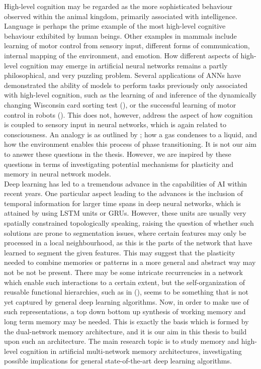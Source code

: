 High-level cognition may be regarded as the more sophisticated behaviour observed within the animal kingdom, primarily associated with intelligence. Language is perhaps the prime example of the most high-level cognitive behaviour exhibited by human beings. Other examples in mammals include learning of motor control from sensory input, different forms of communication, internal mapping of the environment, and emotion.
How different aspects of high-level cognition may emerge in artificial neural networks remains a partly philosophical, and very puzzling problem. Several applications of ANNs have demonstrated the ability of models to perform tasks previously only associated with high-level cognition, such as the learning of and inference of the dynamically changing Wisconsin card sorting test (\cite{Maniadakis2012}), or the successful learning of motor control in robots (\cite{Sugita2005, Yamashita2008, Tani2014}). 
This does not, however, address the aspect of how cognition is coupled to sensory input in neural networks, which is again related to consciousness. An analogy is as outlined by \cite{Freeman2003}; how a gas condenses to a liquid, and how the environment enables this process of phase transitioning.
It is not our aim to answer these questions in the thesis. However, we are inspired by these questions in terms of investigating potential mechanisms for plasticity and memory in neural network models.
\\

Deep learning has led to a tremendous advance in the capabilities of AI within recent years. One particular aspect leading to the advances is the inclusion of temporal information for larger time spans in deep neural networks, which is attained by using LSTM units or GRUs. However, these units are usually very spatially constrained topologically speaking, raising the question of whether such solutions are prone to segmentation issues, where certain features may only be processed in a local neighbourhood, as this is the parts of the network that have learned to segment the given features. This may suggest that the plasticity needed to combine memories or patterns in a more general and abstract way may not be not be present. There may be some intricate recurrencies in a network which enable such interactions to a certain extent, but the self-organization of reusable functional hierarchies, such as in (\cite{Tani2014}), seems to be something that is not yet captured by general deep learning algorithms. Now, in order to make use of such representations, a top down bottom up synthesis of working memory and long term memory may be needed. This is exactly the basis which is formed by the dual-network memory architecture, and it is our aim in this thesis to build upon such an architecture. 
The main research topic is to study memory and high-level cognition in artificial multi-network memory architectures, investigating possible implications for general state-of-the-art deep learning algorithms.

